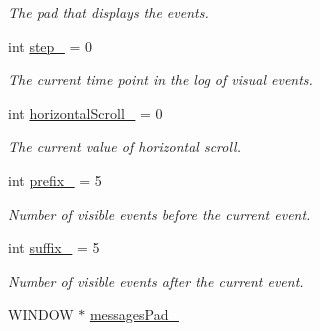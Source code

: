 \begin{DoxyCompactItemize}
\begin{DoxyCompactList}\small\item\em The pad that displays the events. \end{DoxyCompactList}\item 
int \hyperlink{structslb_1_1core_1_1ui_1_1LogWindow_a34a9d7fa3c8d9df040450139a07c16fd}{step\+\_\+} = 0\hypertarget{structslb_1_1core_1_1ui_1_1LogWindow_a34a9d7fa3c8d9df040450139a07c16fd}{}\label{structslb_1_1core_1_1ui_1_1LogWindow_a34a9d7fa3c8d9df040450139a07c16fd}

\begin{DoxyCompactList}\small\item\em The current time point in the log of visual events. \end{DoxyCompactList}\item 
int \hyperlink{structslb_1_1core_1_1ui_1_1LogWindow_a6742c42bf22840fc46cda35db7d73a8a}{horizontal\+Scroll\+\_\+} = 0\hypertarget{structslb_1_1core_1_1ui_1_1LogWindow_a6742c42bf22840fc46cda35db7d73a8a}{}\label{structslb_1_1core_1_1ui_1_1LogWindow_a6742c42bf22840fc46cda35db7d73a8a}

\begin{DoxyCompactList}\small\item\em The current value of horizontal scroll. \end{DoxyCompactList}\item 
int \hyperlink{structslb_1_1core_1_1ui_1_1LogWindow_a5d5f3397ad832fd6905f94fa03c0475a}{prefix\+\_\+} = 5\hypertarget{structslb_1_1core_1_1ui_1_1LogWindow_a5d5f3397ad832fd6905f94fa03c0475a}{}\label{structslb_1_1core_1_1ui_1_1LogWindow_a5d5f3397ad832fd6905f94fa03c0475a}

\begin{DoxyCompactList}\small\item\em Number of visible events before the current event. \end{DoxyCompactList}\item 
int \hyperlink{structslb_1_1core_1_1ui_1_1LogWindow_a7d0ddfe4ebce93798e3fd19fc747d473}{suffix\+\_\+} = 5\hypertarget{structslb_1_1core_1_1ui_1_1LogWindow_a7d0ddfe4ebce93798e3fd19fc747d473}{}\label{structslb_1_1core_1_1ui_1_1LogWindow_a7d0ddfe4ebce93798e3fd19fc747d473}

\begin{DoxyCompactList}\small\item\em Number of visible events after the current event. \end{DoxyCompactList}\item 
W\+I\+N\+D\+OW $\ast$ \hyperlink{structslb_1_1core_1_1ui_1_1LogWindow_a2b1c5fbadbaed7b725b13b537d2b306b}{messages\+Pad\+\_\+}\hypertarget{structslb_1_1core_1_1ui_1_1LogWindow_a2b1c5fbadbaed7b725b13b537d2b306b}{}\label{structslb_1_1core_1_1ui_1_1LogWindow_a2b1c5fbadbaed7b725b13b537d2b306b}


\end{DoxyCompactItemize}

